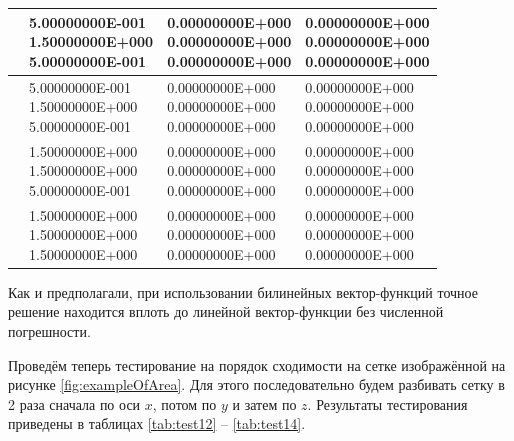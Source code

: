 \begin{table}
\begin{tabularx}{1.0\textwidth}{| >{\raggedright\arraybackslash}X | >{\raggedright\arraybackslash}X | >{\raggedright\arraybackslash}X |>{\raggedright\arraybackslash}X |}
		\centering{($0.5; 0.5; 1.5$)} & \centering{5.00000000E-001 \\ 1.50000000E+000\\
			5.00000000E-001}& \centering{0.00000000E+000 \\ 0.00000000E+000 \\ 0.00000000E+000} & \centering{0.00000000E+000 \\ 0.00000000E+000 \\ 0.00000000E+000} \tabularnewline \hline
		
		\centering{($1.5; 0.5; 1.5$)} & \centering{5.00000000E-001 \\ 1.50000000E+000\\
			5.00000000E-001}& \centering{0.00000000E+000 \\ 0.00000000E+000 \\ 0.00000000E+000} & \centering{0.00000000E+000 \\ 0.00000000E+000 \\ 0.00000000E+000} \tabularnewline \hline
		
		\centering{($0.5; 1.5; 1.5$)} & \centering{1.50000000E+000 \\ 1.50000000E+000\\
			5.00000000E-001}& \centering{0.00000000E+000 \\ 0.00000000E+000 \\ 0.00000000E+000} & \centering{0.00000000E+000 \\ 0.00000000E+000 \\ 0.00000000E+000} \tabularnewline \hline
		
		\centering{($1.5; 1.5; 1.5$)} & \centering{1.50000000E+000 \\ 1.50000000E+000\\
			1.50000000E+000}& \centering{0.00000000E+000 \\ 0.00000000E+000 \\ 0.00000000E+000} & \centering{0.00000000E+000 \\ 0.00000000E+000 \\ 0.00000000E+000} \tabularnewline \hline
		
	\end{tabularx}
	\label{tab:test11}
\end{table}

Как и предполагали, при использовании билинейных вектор-функций точное решение находится вплоть до линейной вектор-функции без численной погрешности.

Проведём теперь тестирование на порядок сходимости на сетке изображённой на рисунке \ref{fig:exampleOfArea}. Для этого последовательно будем разбивать сетку в 2 раза сначала по оси $x$, потом по $y$ и затем по $z$. Результаты тестирования приведены в таблицах \ref{tab:test12} -- \ref{tab:test14}.

